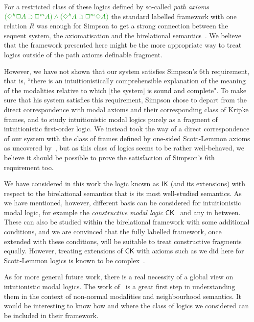 \documentclass[a4paper]{article}
\begin{document}
For a restricted class of these logics defined by so-called \emph{path axioms} $\fm{(\DIA^k\BOX A \IMP\BOX^m A) \AND (\DIA^k A \IMP \BOX^m\DIA A)}$ the standard labelled framework with one relation $R$ was enough for Simpson to get a strong connection between the sequent system, the axiomatisation and the birelational semantics~\cite{simpson:phd}.
%
%
We believe that the framework presented here might be the more appropriate way to treat logics outside of the path axioms definable fragment.

However, we have not shown that our system satisfies Simpson's 6th requirement, that is, ``there is an intuitionistically comprehensible explanation of the meaning of the modalities relative to which [the system] is sound and complete".
%
To make sure that his system satisfies this requirement, Simpson chose to depart from the direct correspondence with modal axioms and their corresponding class of Kripke frames, and to study intuitionistic modal logics purely as a fragment of intuitionistic first-order logic.
%
We instead took the way of a direct correspondence of our system with the class of frames defined by one-sided Scott-Lemmon axioms as uncovered by~\cite{plotkin:stirling:86}, but as this class of logics seems to be rather well-behaved, we believe it should be possible to prove the satisfaction of Simpson's 6th requirement too.

We have considered in this work the logic known as $\mathsf{IK}$ (and its extensions) with respect to the birelational semantics that is its most well-studied semantics.
%
As we have mentioned, however, different basis can be considered for intuitionistic modal logic, for example the \emph{constructive modal logic} $\mathsf{CK}$~\cite{bierman:depaiva:sl00,mendler:scheele:ic11} and any in between.
%
These can also be studied within the birelational framework with some additional conditions, and we are convinced that the fully labelled framework, once extended with these conditions, will be suitable to treat constructive fragments equally.
%
However, treating extensions of $\mathsf{CK}$ with axioms such as we did here for Scott-Lemmon logics is known to be complex~\cite{arisaka:etal:lmcs15}.

As for more general future work, there is a real necessity of a global view on intutionistic modal logics.
%
The work of~\cite{dalmonte:grellois:olivetti:JPL2020} is a great first step in understanding them in the context of non-normal modalities and neighbourhood semantics.
%
It would be interesting to know how and where the class of logics we considered can be included in their framework.



 
 
 
\end{document}
